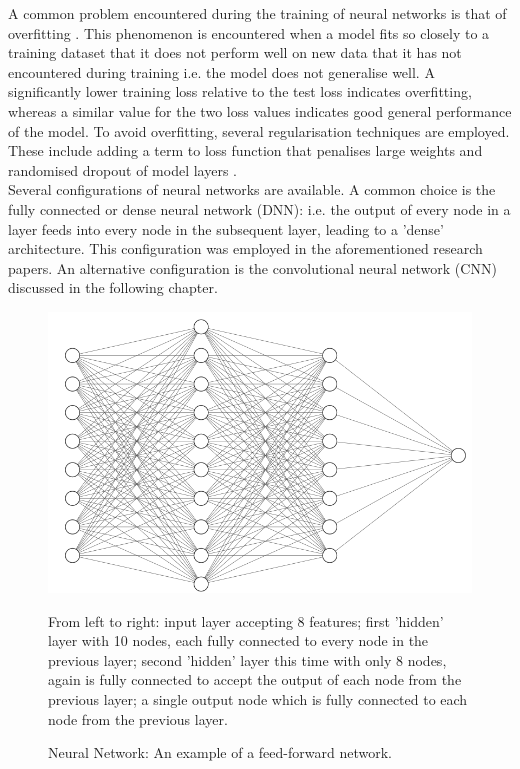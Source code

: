 \noindent
A common problem encountered during the training of neural networks is that of overfitting \cite{hawkins2004problem}. This phenomenon is encountered when a model fits so closely to a training dataset that it does not perform well on new data that it has not encountered during training i.e. the model does not generalise well. A significantly lower training loss relative to the test loss indicates overfitting, whereas a similar value for the two loss values indicates good general performance of the model. To avoid overfitting, several regularisation techniques are employed. These include adding a term to loss function that penalises large weights and randomised dropout of model layers \cite{srivastava2014dropout}. 
\\

\noindent
Several configurations of neural networks are available. A common choice is the fully connected or dense neural network (DNN): i.e. the output of every node in a layer feeds into every node in the subsequent layer, leading to a 'dense' architecture. This configuration was employed in the aforementioned research papers. An alternative configuration is the convolutional neural network (CNN) discussed in the following chapter. 

\begin{figure}[p]
	\centering
	\includegraphics[scale=0.6]{Figures/nn.png}
	\caption{Neural Network: An example of a feed-forward network.} {From left to right: input layer accepting 8 features; first 'hidden' layer with 10 nodes, each fully connected to every node in the previous layer; second 'hidden' layer this time with only 8 nodes, again is fully connected to accept the output of each node from the previous layer; a single output node which is fully connected to each node from the previous layer.}
	\label{fig:neural_network}
\end{figure}

